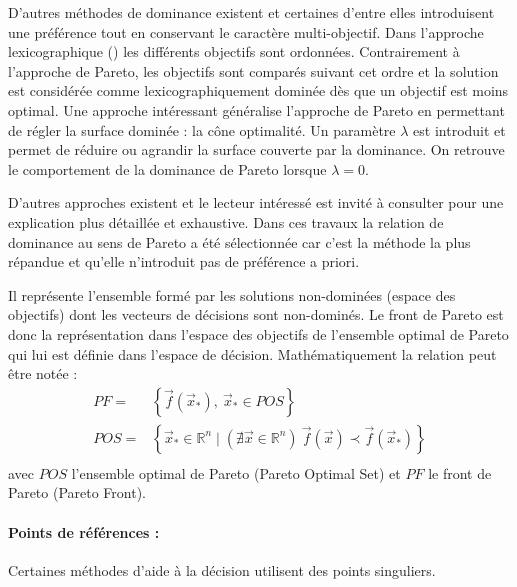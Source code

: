 
D’autres méthodes de dominance existent et certaines d’entre elles introduisent
une préférence tout en conservant le caractère multi-objectif.
Dans l’approche lexicographique () les différents objectifs
sont ordonnées. Contrairement à l’approche de Pareto, les objectifs sont comparés
suivant cet ordre et la solution est considérée comme lexicographiquement dominée dès
que un objectif est moins optimal.
Une approche intéressant généralise l’approche de Pareto en permettant de régler
la surface dominée : la cône optimalité. Un paramètre $\lambda$ est introduit et
permet de réduire ou agrandir la surface couverte par la dominance. On retrouve le
comportement de la dominance de Pareto lorsque $\lambda = 0$.

D’autres approches existent et le lecteur intéressé est invité à consulter \cite{Collette2002}
pour une explication plus détaillée et exhaustive. Dans ces travaux la relation de
dominance au sens de Pareto a été sélectionnée car c’est la méthode la plus répandue
et qu’elle n’introduit pas de préférence a priori.

\begin{Def}\label{def:front_de_pareto}
Il représente l’ensemble formé par les solutions non-dominées (espace des objectifs)
dont les vecteurs de décisions sont non-dominés.
Le front de Pareto est donc la représentation dans l’espace des objectifs
de l’ensemble optimal de Pareto qui lui est définie dans l’espace de décision.
Mathématiquement la relation peut être notée :
\begin{equation}
  \begin{aligned}
    PF   =& \left\{ \vec{f}(\vec{x}_{*}), \  \vec{x}_{*} \in POS \right\} \\
    POS  =& \left\{ \vec{x}_{*} \in \mathbb{R}^{n} \mid (\nexists \vec{x} \in \mathbb{R}^{n}) \  \vec{f}(\vec{x}) \prec \vec{f}(\vec{x}_{*}) \right\} \\
  \end{aligned}
\end{equation}
avec $POS$ l’ensemble optimal de Pareto (Pareto Optimal Set) et $PF$ le front de Pareto
(Pareto Front).
\end{Def}

\paragraph{Points de références : } %
\label{par:points_de_references}
Certaines méthodes d’aide à la décision utilisent des points singuliers.

